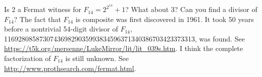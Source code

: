   Is $2$ a Fermat witness for $F_{14} = 2^{2^{14}} + 1$?
  What about $3$?
  Can you find a divisor of $F_{14}$?
  The fact that $F_{14}$ is composite was first discovered in 1961.
  It took 50 years before a nontrivial 54-digit divisor of $F_{14}$,
  116928085873074369829035993834596371340386703423373313,
  was found.
  See \url{https://t5k.org/mersenne/LukeMirror/lit/lit_039s.htm}.
  I think the complete factorization of $F_{14}$ is still unknown.
  See \url{http://www.prothsearch.com/fermat.html}.

